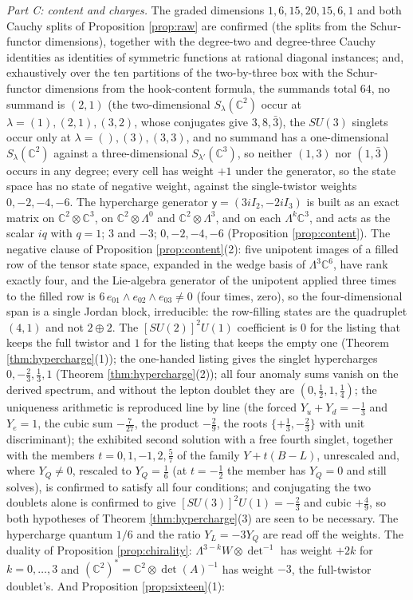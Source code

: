 \documentclass[11pt]{article}
\theoremstyle{definition}
\newcommand{\C}{\mathbb{C}}
\begin{document}
\emph{Part C: content and charges.} The graded dimensions $1, 6, 15, 20, 15, 6, 1$ and both Cauchy splits of Proposition \ref{prop:raw} are confirmed (the splits from the Schur-functor dimensions), together with the degree-two and degree-three Cauchy identities as identities of symmetric functions at rational diagonal instances; and, exhaustively over the ten partitions of the two-by-three box with the Schur-functor dimensions from the hook-content formula, the summands total $64$, no summand is $(2,1)$ (the two-dimensional $S_{\lambda}(\C^{2})$ occur at $\lambda = (1), (2,1), (3,2)$, whose conjugates give $3, 8, \bar{3}$), the $SU(3)$ singlets occur only at $\lambda = (), (3), (3,3)$, and no summand has a one-dimensional $S_{\lambda}(\C^{2})$ against a three-dimensional $S_{\lambda'}(\C^{3})$, so neither $(1,3)$ nor $(1,\bar{3})$ occurs in any degree; every cell has weight $+1$ under the generator, so the state space has no state of negative weight, against the single-twistor weights $0, -2, -4, -6$. The hypercharge generator $\mathsf{y} = (3iI_{2}, -2iI_{3})$ is built as an exact matrix on $\C^{2} \otimes \C^{3}$, on $\C^{2} \otimes \Lambda^{0}$ and $\C^{2} \otimes \Lambda^{3}$, and on each $\Lambda^{k}\C^{3}$, and acts as the scalar $iq$ with $q = 1$; $3$ and $-3$; $0, -2, -4, -6$ (Proposition \ref{prop:content}). The negative clause of Proposition \ref{prop:content}(2): five unipotent images of a filled row of the tensor state space, expanded in the wedge basis of $\Lambda^{3}\C^{6}$, have rank exactly four, and the Lie-algebra generator of the unipotent applied three times to the filled row is $6\,e_{01} \wedge e_{02} \wedge e_{03} \neq 0$ (four times, zero), so the four-dimensional span is a single Jordan block, irreducible: the row-filling states are the quadruplet $(4,1)$ and not $2 \oplus 2$. The $[SU(2)]^{2}U(1)$ coefficient is $0$ for the listing that keeps the full twistor and $1$ for the listing that keeps the empty one (Theorem \ref{thm:hypercharge}(1)); the one-handed listing gives the singlet hypercharges $0, -\tfrac23, \tfrac13, 1$ (Theorem \ref{thm:hypercharge}(2)); all four anomaly sums vanish on the derived spectrum, and without the lepton doublet they are $(0, \tfrac12, 1, \tfrac14)$; the uniqueness arithmetic is reproduced line by line (the forced $Y_{u} + Y_{d} = -\tfrac13$ and $Y_{e} = 1$, the cubic sum $-\tfrac{7}{27}$, the product $-\tfrac29$, the roots $\{+\tfrac13, -\tfrac23\}$ with unit discriminant); the exhibited second solution with a free fourth singlet, together with the members $t = 0, 1, -1, 2, \tfrac57$ of the family $Y + t(B-L)$, unrescaled and, where $Y_{Q} \neq 0$, rescaled to $Y_{Q} = \tfrac16$ (at $t = -\tfrac12$ the member has $Y_{Q} = 0$ and still solves), is confirmed to satisfy all four conditions; and conjugating the two doublets alone is confirmed to give $[SU(3)]^{2}U(1) = -\tfrac23$ and cubic $+\tfrac49$, so both hypotheses of Theorem \ref{thm:hypercharge}(3) are seen to be necessary. The hypercharge quantum $1/6$ and the ratio $Y_{L} = -3Y_{Q}$ are read off the weights. The duality of Proposition \ref{prop:chirality}: $\Lambda^{3-k}W \otimes \det^{-1}$ has weight $+2k$ for $k = 0, \ldots, 3$ and $(\C^{2})^{*} = \C^{2} \otimes \det(A)^{-1}$ has weight $-3$, the full-twistor doublet's. And Proposition \ref{prop:sixteen}(1): 
\end{document}
